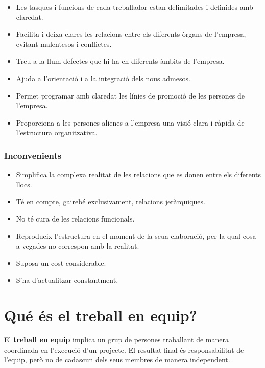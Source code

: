 \documentclass[
  openany]{book}
\providecommand{\tightlist}{%
  \setlength{\itemsep}{0pt}\setlength{\parskip}{0pt}}
\begin{document}
\begin{itemize}
\tightlist
\item
  Les tasques i funcions de cada treballador estan delimitades i definides amb claredat.
\item
  Facilita i deixa clares les relacions entre els diferents òrgans de l'empresa, evitant malentesos i conflictes.
\item
  Treu a la llum defectes que hi ha en diferents àmbits de l'empresa.
\item
  Ajuda a l'orientació i a la integració dels nous admesos.
\item
  Permet programar amb claredat les línies de promoció de les persones de l'empresa.
\item
  Proporciona a les persones alienes a l'empresa una visió clara i ràpida de l'estructura organitzativa.
\end{itemize}

\hypertarget{inconvenients}{%
\subsubsection{Inconvenients}\label{inconvenients}}

\begin{itemize}
\tightlist
\item
  Simplifica la complexa realitat de les relacions que es donen entre els diferents llocs.
\item
  Té en compte, gairebé exclusivament, relacions jeràrquiques.
\item
  No té cura de les relacions funcionals.
\item
  Reprodueix l'estructura en el moment de la seua elaboració, per la qual cosa a vegades no correspon amb la realitat.
\item
  Suposa un cost considerable.
\item
  S'ha d'actualitzar constantment.
\end{itemize}

\hypertarget{quuxe9-uxe9s-el-treball-en-equip}{%
\section{Qué és el treball en equip?}\label{quuxe9-uxe9s-el-treball-en-equip}}

El \textbf{treball en equip} implica un grup de persones traballant de manera coordinada en l'execució d'un projecte. El resultat final és responsabilitat de l'equip, però no de cadascun dels seus membres de manera independent.
\end{document}
